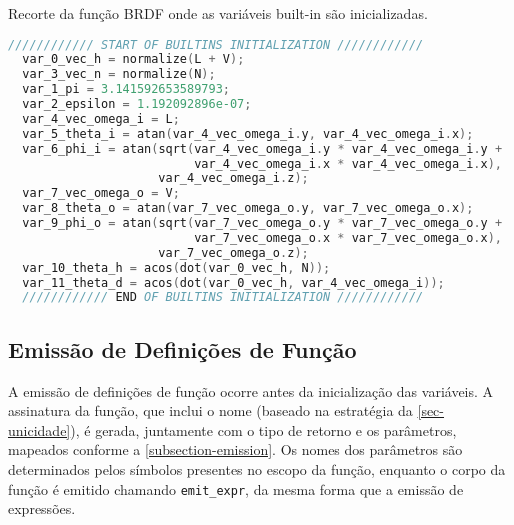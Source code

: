 \begin{codigo}[H]
    \caption{\small Recorte da função BRDF onde as variáveis built-in são inicializadas.}
    \label{cod-builtins-emitted}
\begin{lstlisting}[language=C, frame=none, inputencoding=utf8]
  //////////// START OF BUILTINS INITIALIZATION ////////////
  var_0_vec_h = normalize(L + V);
  var_3_vec_n = normalize(N);
  var_1_pi = 3.141592653589793;
  var_2_epsilon = 1.192092896e-07;
  var_4_vec_omega_i = L;
  var_5_theta_i = atan(var_4_vec_omega_i.y, var_4_vec_omega_i.x);
  var_6_phi_i = atan(sqrt(var_4_vec_omega_i.y * var_4_vec_omega_i.y +
                          var_4_vec_omega_i.x * var_4_vec_omega_i.x),
                     var_4_vec_omega_i.z);
  var_7_vec_omega_o = V;
  var_8_theta_o = atan(var_7_vec_omega_o.y, var_7_vec_omega_o.x);
  var_9_phi_o = atan(sqrt(var_7_vec_omega_o.y * var_7_vec_omega_o.y +
                          var_7_vec_omega_o.x * var_7_vec_omega_o.x),
                     var_7_vec_omega_o.z);
  var_10_theta_h = acos(dot(var_0_vec_h, N));
  var_11_theta_d = acos(dot(var_0_vec_h, var_4_vec_omega_i));
  //////////// END OF BUILTINS INITIALIZATION ////////////
\end{lstlisting}
\end{codigo}




%
%

\subsection{Emissão de Definições de Função}

A emissão de definições de função ocorre antes da inicialização das variáveis. A assinatura da função, que inclui o nome (baseado na estratégia da \autoref{sec-unicidade}), é gerada, juntamente com o tipo de retorno e os parâmetros, mapeados conforme a \autoref{subsection-emission}. Os nomes dos parâmetros são determinados pelos símbolos presentes no escopo da função, enquanto o corpo da função é emitido chamando \verb|emit_expr|, da mesma forma que a emissão de expressões.

